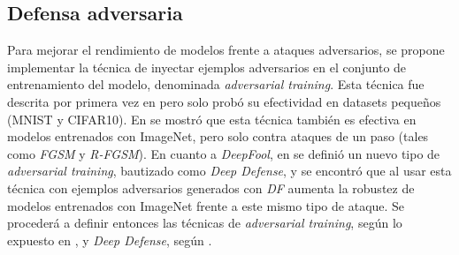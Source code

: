 \documentclass[conference]{IEEEtran}
\begin{document}
\subsection{Defensa adversaria}
Para mejorar el rendimiento de modelos frente a ataques adversarios, se propone implementar la técnica de inyectar ejemplos adversarios en el conjunto de entrenamiento del modelo, denominada \textit{adversarial training}. Esta técnica fue descrita por primera vez en \cite{goodfellow2014} pero solo probó su efectividad en datasets pequeños (MNIST y CIFAR10). En \cite{kurakin2016} se mostró que esta técnica también es efectiva en modelos entrenados con ImageNet, pero solo contra ataques de un paso (tales como \textit{FGSM} y \textit{R-FGSM}). En cuanto a \textit{DeepFool}, en \cite{deepdefense} se definió un nuevo tipo de \textit{adversarial training}, bautizado como \textit{Deep Defense}, y se encontró que al usar esta técnica con ejemplos adversarios generados con \textit{DF} aumenta la robustez de modelos entrenados con ImageNet frente a este mismo tipo de ataque. Se procederá a definir entonces las técnicas de \textit{adversarial training}, según lo expuesto en \cite{kurakin2016}, y \textit{Deep Defense}, según \cite{deepdefense}.
\end{document}
